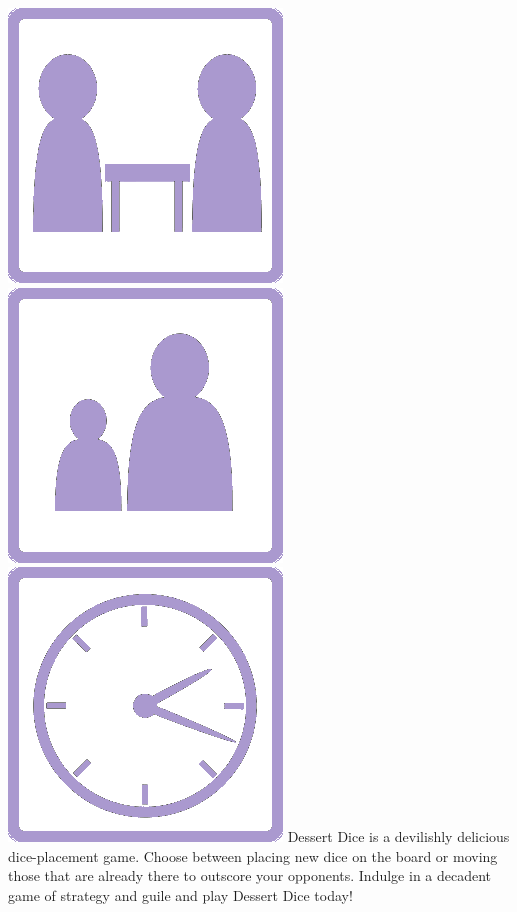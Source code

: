 \documentclass[a5paper, DIV=18, 12pt]{scrartcl}
\begin{document}
\includegraphics[scale=0.125]{Images/player_count_icon.png} {\setmainfont[Scale=1.25]{Londrina-Solid}\Huge \raisebox{6.55pt}{\textcolor{IceCreamPurple}{:\ 2-4}}} \hfill \includegraphics[scale=0.125]{Images/player_age_icon.png} {\setmainfont[Scale=1.25]{Londrina-Solid}\Huge \raisebox{6.55pt}{\textcolor{IceCreamPurple}{:\ 12+}}}\hfill \includegraphics[scale=0.125]{Images/play_time_icon.png} {\setmainfont[Scale=1.25]{Londrina-Solid}\Huge \raisebox{6.55pt}{\textcolor{IceCreamPurple}{:\ 10-15}}}
\flushleft
Dessert Dice is a devilishly delicious dice-placement game. Choose between placing new dice on the board or moving those that are already there to outscore your opponents. Indulge in a decadent game of strategy and guile and play Dessert Dice today!
\end{document}
